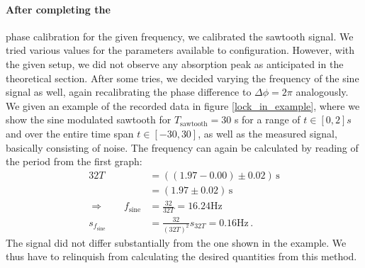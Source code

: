 \paragraph{After completing the} 
phase calibration for the given frequency, we calibrated the 
sawtooth signal. We tried various values for the parameters available to configuration. 
However, with the given setup, we did not observe any absorption peak as anticipated in the 
theoretical section. After some tries, we decided varying the frequency of the sine signal as 
well, again recalibrating the phase difference to $\Delta \phi = 2 \pi$ analogously.  
We given an example of the recorded data in figure \ref{lock_in_example}, where we show 
the sine modulated sawtooth for $T_\mathrm{sawtooth} = 30$ s for a range of $t \in [0, 2] s$ and
over the entire time span $t \in [-30, 30]$, as well as 
the measured signal, basically consisting of noise. The frequency can again be calculated 
by reading of the period from the first graph:
\begin{align}
    32T  &= \left((1.97 - 0.00) \pm 0.02\right) \, \mathrm{s} \\
        &= (1.97 \pm 0.02) \, \mathrm{s} \\
    \Rightarrow \qquad f_\mathrm{sine} &= \frac{32}{32T} = 16.24 \mathrm{Hz} \\
    s_{f_\mathrm{sine}} &= \frac{32}{(32T)^2} s_{32T} = 0.16 \mathrm{Hz} \, .
\end{align}
The signal did not differ substantially from the one shown in the example. We thus have to 
relinquish from calculating the desired quantities from this method. 

\FloatBarrier
